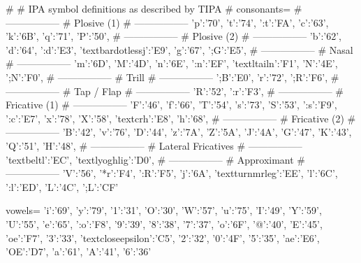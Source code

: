 #
# IPA symbol definitions as described by TIPA
#
consonants={
# -----------------
# Plosive (1)
# -----------------
'p':'70',
't':'74',
':t':'FA',
'c':'63',
'k':'6B',
'q':'71',
'P':'50',
# -----------------
# Plosive (2)
# -----------------
'b':'62',
'd':'64',
':d':'E3',
'textbardotlessj':'E9',
'g':'67',
';G':'E5',
# -----------------
# Nasal
# -----------------
'm':'6D',
'M':'4D',
'n':'6E',
':n':'EF',
'textltailn':'F1',
'N':'4E',
';N':'F0',
# -----------------
# Trill
# -----------------
';B':'E0',
'r':'72',
';R':'F6',
# -----------------
# Tap / Flap
# -----------------
'R':'52',
':r':'F3',
# -----------------
# Fricative (1)
# -----------------
'F':'46',
'f':'66',
'T':'54',
's':'73',
'S':'53',
':s':'F9',
':c':'E7',
'x':'78',
'X':'58',
'textcrh':'E8',
'h':'68',
# -----------------
# Fricative (2)
# -----------------
'B':'42',
'v':'76',
'D':'44',
'z':'7A',
'Z':'5A',
'J':'4A',
'G':'47',
'K':'43',
'Q':'51',
'H':'48',
# -----------------
# Lateral Fricatives
# -----------------
'textbeltl':'EC',
'textlyoghlig':'D0',
# -----------------
# Approximant
# -----------------
'V':'56',
'*r':'F4',
':R':'F5',
'j':'6A',
'textturnmrleg':'EE',
'l':'6C',
':l':'ED',
'L':'4C',
';L':'CF'}

vowels={
'i':'69',
'y':'79',
'1':'31',
'O':'30',
'W':'57',
'u':'75',
'I':'49',
'Y':'59',
'U':'55',
'e':'65',
':o':'F8',
'9':'39',
'8':'38',
'7':'37',
'o':'6F',
'@':'40',
'E':'45',
'oe':'F7',
'3':'33',
'textcloseepsilon':'C5',
'2':'32',
'0':'4F',
'5':'35',
'ae':'E6',
'OE':'D7',
'a':'61',
'A':'41',
'6':'36'}